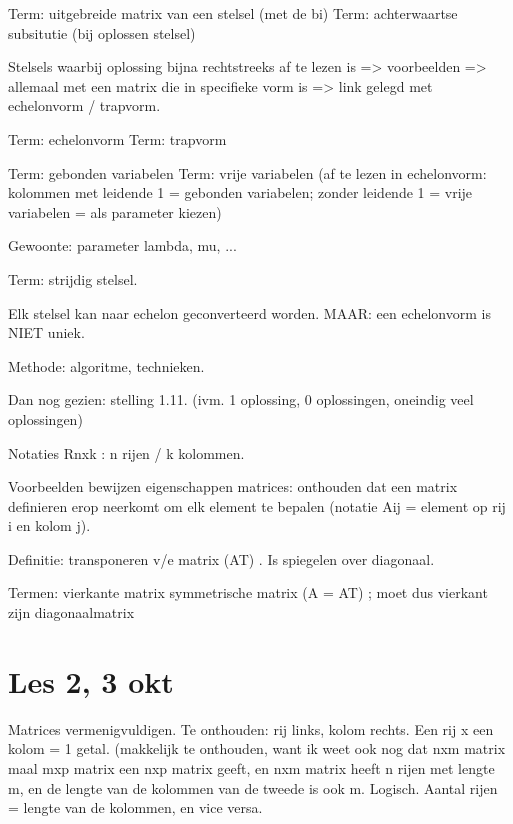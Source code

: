 \documentclass{article}
\begin{document}
Term: uitgebreide matrix van een stelsel (met de bi) 
Term: achterwaartse subsitutie (bij oplossen stelsel) 

Stelsels waarbij oplossing bijna rechtstreeks af te lezen is => voorbeelden => allemaal met een matrix die in specifieke vorm is => link gelegd met echelonvorm / trapvorm. 

Term: echelonvorm
Term: trapvorm

Term: gebonden variabelen
Term: vrije variabelen
(af te lezen in echelonvorm: kolommen met leidende 1 = gebonden variabelen; zonder leidende 1 = vrije variabelen = als parameter kiezen)

Gewoonte: parameter lambda, mu, ... 

Term: strijdig stelsel. 

Elk stelsel kan naar echelon geconverteerd worden. 
MAAR: een echelonvorm is NIET uniek. 

Methode: algoritme, technieken. 

Dan nog gezien: stelling 1.11. (ivm. 1 oplossing, 0 oplossingen, oneindig veel oplossingen)

Notaties Rnxk  : n rijen / k kolommen. 

Voorbeelden bewijzen eigenschappen matrices: onthouden dat een matrix definieren erop neerkomt om elk element te bepalen (notatie Aij = element op rij i en kolom j). 

Definitie: transponeren v/e matrix (AT) . Is spiegelen over diagonaal. 

Termen: 
vierkante matrix
symmetrische matrix (A = AT) ; moet dus vierkant zijn 
diagonaalmatrix



\section{Les 2, 3 okt}


Matrices vermenigvuldigen. Te onthouden: rij links, kolom rechts. Een rij x een kolom = 1 getal. (makkelijk te onthouden, want ik weet ook nog dat nxm matrix maal mxp matrix een nxp matrix geeft, en nxm matrix heeft n rijen met lengte m, en de lengte van de kolommen van de tweede is ook m. Logisch. Aantal rijen = lengte van de kolommen, en vice versa. 

% 
\end{document}

